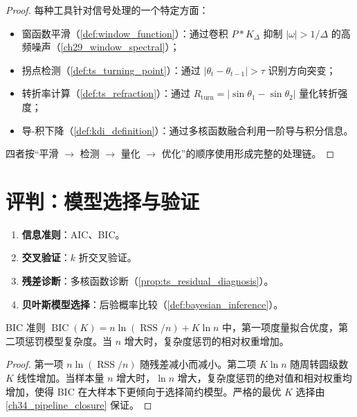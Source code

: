\begin{proof}
每种工具针对信号处理的一个特定方面：
\begin{itemize}
    \item 窗函数平滑（\cref{def:window_function}）：通过卷积 $P * K_\Delta$ 抑制 $|\omega| > 1/\Delta$ 的高频噪声（\cref{ch29_window_spectral}）；
    \item 拐点检测（\cref{def:ts_turning_point}）：通过 $|\theta_t - \theta_{t-1}| > \tau$ 识别方向突变；
    \item 转折率计算（\cref{def:ts_refraction}）：通过 $R_{\text{turn}} = |\sin\theta_1 - \sin\theta_2|$ 量化转折强度；
    \item 导-积下降（\cref{def:kdi_definition}）：通过多核函数融合利用一阶导与积分信息。
\end{itemize}
四者按“平滑 $\to$ 检测 $\to$ 量化 $\to$ 优化”的顺序使用形成完整的处理链。
\end{proof}

\section{评判：模型选择与验证}

\begin{definition}[评判的标准]\label{def:evaluation_criteria}
\begin{enumerate}[label=(\roman*)]
    \item \textbf{信息准则}：AIC、BIC。
    \item \textbf{交叉验证}：$k$ 折交叉验证。
    \item \textbf{残差诊断}：多核函数诊断（\cref{prop:ts_residual_diagnosis}）。
    \item \textbf{贝叶斯模型选择}：后验概率比较（\cref{def:bayesian_inference}）。
\end{enumerate}
\end{definition}

\begin{proposition}\label{prop:bic_balance}
BIC 准则 $\operatorname{BIC}(K) = n\ln(\operatorname{RSS}/n) + K\ln n$ 中，第一项度量拟合优度，第二项惩罚模型复杂度。当 $n$ 增大时，复杂度惩罚的相对权重增加。
\end{proposition}

\begin{proof}
第一项 $n\ln(\operatorname{RSS}/n)$ 随残差减小而减小。第二项 $K\ln n$ 随周转圆级数 $K$ 线性增加。当样本量 $n$ 增大时，$\ln n$ 增大，复杂度惩罚的绝对值和相对权重均增加，使得 BIC 在大样本下更倾向于选择简约模型。严格的最优 $K$ 选择由 \cref{ch34_pipeline_closure} 保证。
\end{proof}

